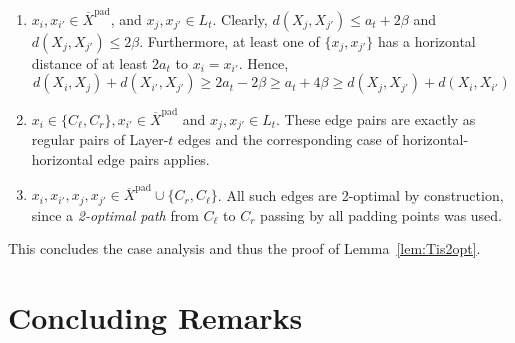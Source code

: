 \documentclass[11pt,DIV=12,a4paper]{scrartcl}
\newcommand{\pad}{\mathrm{pad}}
\newcommand{\lemref}[1]{Lemma~\ref{lem:#1}}
\newcommand{\TSP}{\mathsf{TSP}}
\newcommand{\TwoOPT}{\mathsf{2OPT}}
\DeclareMathOperator{\pert}{pert}
\begin{document}
\begin{enumerate}
\item $x_i, x_{i'} \in \overline{X}^\pad$, and $x_j, x_{j'} \in L_t$. Clearly, $d(X_j,X_{j'}) \le a_t + 2\beta$ and $d(X_j, X_{j'}) \le 2\beta$. Furthermore, at least one of $\{x_j, x_{j'}\}$ has a horizontal distance of at least $2a_t$ to $x_i=x_{i'}$. Hence, 
\[d(X_i, X_j) + d(X_{i'}, X_{j'})\ge 2a_t - 2\beta \ge a_t + 4\beta \ge d(X_j, X_{j'}) + d(X_i, X_{i'})   \]
\item $x_i\in \{C_\ell,C_r\}, x_{i'} \in \overline{X}^\pad$ and $x_j, x_{j'} \in L_t$. These edge pairs are exactly as regular pairs of Layer-$t$ edges and the corresponding case of horizontal-horizontal edge pairs applies.
\item $x_i, x_{i'}, x_j, x_{j'} \in \overline{X}^\pad \cup \{C_r, C_\ell\}$. All such edges are 2-optimal by construction, since a \emph{2-optimal path} from $C_\ell$ to $C_r$ passing by all padding points was used.
\end{enumerate}

This concludes the case analysis and thus the proof of \lemref{Tis2opt}.

%

\section{Concluding Remarks}
\label{sec:concl}
\end{document}
